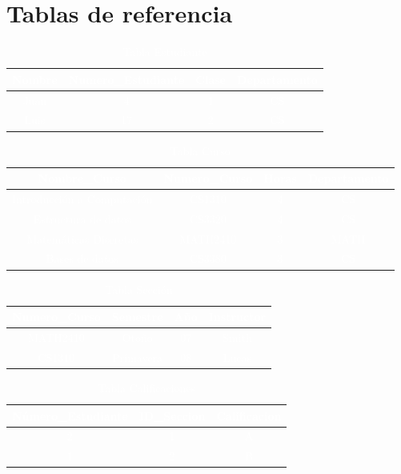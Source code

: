 \documentclass[a4paper,12pt]{article}
\begin{document}
\newpage
\thispagestyle{fancy} %

\section*{Tablas de referencia}

\begin{table}[h]
    \centering
    \caption{\textcolor{white}{Tabla Estudiante}}
    \label{tabla_estudiante}
    \textcolor{white}{
    \begin{tabular}{|c|c|c|c|} 
    \hline
        Nombre & Numero\_Estudiante & Clase & Departamento \\ \hline
        Juan & 4 & 1 & CS \\ \hline
        Luis & 17 & 2 & CS \\ 
    \hline
    \end{tabular}
    }
\end{table}
\begin{table}[h]
    \centering
    \caption{\textcolor{white}{Tabla Curso}}
    \label{tabla_curso}
    \textcolor{white}{
    \begin{tabular}{|c|c|c|c|}
    \hline
    Nombre\_Curso & Numero\_Curso & Horas & Departamento \\
    \hline
        Introducción a Computación & CS1310 & 4 & CS \\
        Estructura de datos & CS3320 & 4 & CS \\
        Matemáticas Discretas & MATH2410 & 3 & MATH \\
        Bases de datos & CS3380 & 3 & CS \\
    \hline
    \end{tabular}
    }
\end{table}
\begin{table}[h]
    \centering
    \caption{\textcolor{white}{Tabla Sección}}
    \label{tabla_seccion}
    \textcolor{white}{
    \begin{tabular}{|c|c|c|c|}
    \hline
        Numero\_Curso & Semestre & Año & Instructor \\ \hline
        MATH2410 & Otoño & 07 & Smith \\
        CS1310 & Primavera & 08 & Lucas \\
    \hline
    \end{tabular}
    }
\end{table}
\begin{table}[h]
    \centering
    \caption{\textcolor{white}{Tabla Calificaciones}}
    \label{tabla_calificaciones}
    \textcolor{white}{
    \begin{tabular}{|c|c|c|}
    \hline
        Número\_Estudiante & ID\_Seccion & Calificacion \\ \hline
                2      &     1       & A \\
                1      &     2       & B \\
    \hline
    \end{tabular}
    }
\end{table}
\end{document}
